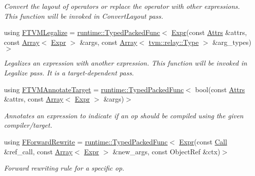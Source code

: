 \begin{DoxyCompactItemize}
\begin{DoxyCompactList}\small\item\em Convert the layout of operators or replace the operator with other expressions. This function will be invoked in Convert\+Layout pass. \end{DoxyCompactList}\item 
using \hyperlink{namespacetvm_1_1relay_a40770ea2c292eec7b9ebe4d310c67fb5}{F\+T\+V\+M\+Legalize} = \hyperlink{classtvm_1_1runtime_1_1TypedPackedFunc}{runtime\+::\+Typed\+Packed\+Func}$<$ \hyperlink{namespacetvm_1_1relay_a5b84e3790f89bb3fad5c7911eeb99531}{Expr}(const \hyperlink{classtvm_1_1Attrs}{Attrs} \&attrs, const \hyperlink{classtvm_1_1Array}{Array}$<$ \hyperlink{namespacetvm_1_1relay_a5b84e3790f89bb3fad5c7911eeb99531}{Expr} $>$ \&args, const \hyperlink{classtvm_1_1Array}{Array}$<$ \hyperlink{namespacetvm_1_1relay_a661d95f170bca230773914caeef3fe52}{tvm\+::relay\+::\+Type} $>$ \&arg\+\_\+types)$>$
\begin{DoxyCompactList}\small\item\em Legalizes an expression with another expression. This function will be invoked in Legalize pass. It is a target-\/dependent pass. \end{DoxyCompactList}\item 
using \hyperlink{namespacetvm_1_1relay_ab140f1857d8471d98fe5371f8da68154}{F\+T\+V\+M\+Annotate\+Target} = \hyperlink{classtvm_1_1runtime_1_1TypedPackedFunc}{runtime\+::\+Typed\+Packed\+Func}$<$ bool(const \hyperlink{classtvm_1_1Attrs}{Attrs} \&attrs, const \hyperlink{classtvm_1_1Array}{Array}$<$ \hyperlink{namespacetvm_1_1relay_a5b84e3790f89bb3fad5c7911eeb99531}{Expr} $>$ \&args)$>$
\begin{DoxyCompactList}\small\item\em Annotates an expression to indicate if an op should be compiled using the given compiler/target. \end{DoxyCompactList}\item 
using \hyperlink{namespacetvm_1_1relay_aa04117f6f0a173924ff2f6d080c9265c}{F\+Forward\+Rewrite} = \hyperlink{classtvm_1_1runtime_1_1TypedPackedFunc}{runtime\+::\+Typed\+Packed\+Func}$<$ \hyperlink{namespacetvm_1_1relay_a5b84e3790f89bb3fad5c7911eeb99531}{Expr}(const \hyperlink{classtvm_1_1relay_1_1Call}{Call} \&ref\+\_\+call, const \hyperlink{classtvm_1_1Array}{Array}$<$ \hyperlink{namespacetvm_1_1relay_a5b84e3790f89bb3fad5c7911eeb99531}{Expr} $>$ \&new\+\_\+args, const Object\+Ref \&ctx)$>$
\begin{DoxyCompactList}\small\item\em Forward rewriting rule for a specific op. \end{DoxyCompactList}\item 

\end{DoxyCompactItemize}
